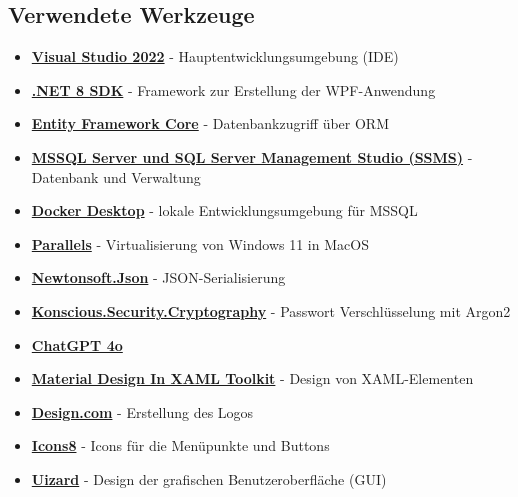 \subsection*{Verwendete Werkzeuge}
\begin{itemize}
    \item \href{https://visualstudio.microsoft.com}{\textbf{Visual Studio 2022}} - Hauptentwicklungsumgebung (IDE)

    \item \href{https://dotnet.microsoft.com}{\textbf{.NET 8 SDK}} - Framework zur Erstellung der WPF-Anwendung

    \item \href{https://github.com/dotnet/efcore}{\textbf{Entity Framework Core}} - Datenbankzugriff über ORM

    \item \href{https://www.microsoft.com/sql-server}{\textbf{MSSQL Server und SQL Server Management Studio (SSMS)}} - Datenbank und Verwaltung
    
    \item \href{https://www.docker.com}{\textbf{Docker Desktop}} - lokale Entwicklungsumgebung für MSSQL

    \item \href{https://www.parallels.com}{\textbf{Parallels}} - Virtualisierung von Windows 11 in MacOS

    \item \href{https://www.newtonsoft.com/json}{\textbf{Newtonsoft.Json}} - JSON-Serialisierung
    
    \item \href{https://github.com/kmaragon/Konscious.Security.Cryptography}{\textbf{Konscious.Security.Cryptography}} - Passwort Verschlüsselung mit Argon2

    \item \href{https://openai.com}{\textbf{ChatGPT 4o}}

    \item \href{https://github.com/MaterialDesignInXAML/MaterialDesignInXamlToolkit}{\textbf{Material Design In XAML Toolkit}} - Design von XAML-Elementen

    \item \href{https://www.design.com}{\textbf{Design.com}} - Erstellung des Logos

    \item \href{https://icons8.de}{\textbf{Icons8}} - Icons für die Menüpunkte und Buttons

    \item \href{https://uizard.io}{\textbf{Uizard}} - Design der grafischen Benutzeroberfläche (GUI)


\end{itemize}
